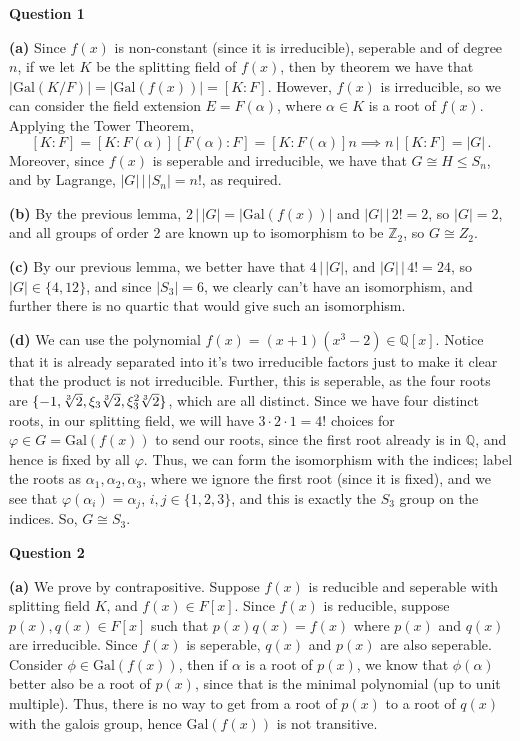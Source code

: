 \documentclass[10pt]{article}
\newcommand{\Z}{\mathbb{Z}}
\newcommand{\Q}{\mathbb{Q}}
\newcommand{\Gal}{\text{Gal}}
\begin{document}
\textbf{Question 1}

\textbf{(a)} Since $f(x)$ is non-constant (since it is irreducible), seperable and of degree $n$, if we let $K$ be the splitting field of $f(x)$, then by theorem we have that $|\Gal(K/F)| = |\Gal(f(x))| = [K:F]$. However, $f(x)$ is irreducible, so we can consider the field extension $E = F(\alpha)$, where $\alpha\in K$ is a root of $f(x)$. Applying the Tower Theorem,
\[ [K:F] = [K:F(\alpha)][F(\alpha):F] = [K:F(\alpha)]n \implies n\, |\, [K:F] = |G| \, . \]
Moreover, since $f(x)$ is seperable and irreducible, we have that $G \cong H \leq S_{n}$, and by Lagrange, $|G|\, |\, |S_{n}| = n!$, as required.

\textbf{(b)} By the previous lemma, $2\, |\, |G| = |\Gal(f(x))|$ and $|G| \, |\, 2! = 2$, so $|G| = 2$, and all groups of order 2 are known up to isomorphism to be $\Z_{2}$, so $G \cong Z_{2}$.

\textbf{(c)} By our previous lemma, we better have that $4\, |\, |G|$, and $|G| \, | \, 4! = 24$, so $|G| \in \{4,12\}$, and since $|S_{3}| = 6$, we clearly can't have an isomorphism, and further there is no quartic that would give such an isomorphism.

\textbf{(d)} We can use the polynomial $f(x) = (x + 1)(x^{3} - 2)\in \Q[x]$. Notice that it is already separated into it's two irreducible factors just to make it clear that the product is not irreducible. Further, this is seperable, as the four roots are $\{-1, \sqrt[\leftroot{1}\uproot{0}3]{2}, \xi_{3}\sqrt[\leftroot{1}\uproot{0}3]{2}, \xi_{3}^{2}\sqrt[\leftroot{1}\uproot{0}3]{2}\}$, which are all distinct. Since we have four distinct roots, in our splitting field, we will have $3\cdot 2\cdot 1 = 4!$ choices for $\varphi \in G = \Gal(f(x))$ to send our roots, since the first root already is in $\Q$, and hence is fixed by all $\varphi$. Thus, we can form the isomorphism with the indices; label the roots as $\alpha_{1},\alpha_{2},\alpha_{3}$, where we ignore the first root (since it is fixed), and we see that $\varphi(\alpha_{i}) = \alpha_{j}$, $i,j \in \{1,2,3\}$, and this is exactly the $S_{3}$ group on the indices. So, $G \cong S_{3}$.

\newpage
\textbf{Question 2}

\textbf{(a)} We prove by contrapositive. Suppose $f(x)$ is reducible and seperable with splitting field $K$, and $f(x) \in F[x]$. Since $f(x)$ is reducible, suppose $p(x),q(x)\in F[x]$ such that $p(x)q(x) = f(x)$ where $p(x)$ and $q(x)$ are irreducible. Since $f(x)$ is seperable, $q(x)$ and $p(x)$ are also seperable. Consider $\phi \in \Gal(f(x))$, then if $\alpha$ is a root of $p(x)$, we know that $\phi(\alpha)$ better also be a root of $p(x)$, since that is the minimal polynomial (up to unit multiple). Thus, there is no way to get from a root of $p(x)$ to a root of $q(x)$ with the galois group, hence $\Gal(f(x))$ is not transitive. 
\end{document}
